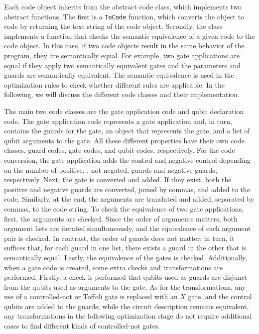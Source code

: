Each code object inherits from the abstract code class, which implements two abstract functions. The first is a \texttt{ToCode} function, which converts the object to code by returning the text string of the code object. Secondly, the class implements a function that checks the semantic equivalence of a given code to the code object. In this case, if two code objects result in the same behavior of the program, they are semantically equal. For example, two gate applications are equal if they apply two semantically equivalent gates and the parameters and guards are semantically equivalent. The semantic equivalence is used in the optimization rules to check whether different rules are applicable. In the following, we will discuss the different code classes and their implementation. 

The main two code classes are the gate application code and qubit declaration code. The gate application code represents a gate application and, in turn, contains the guards for the gate, an object that represents the gate, and a list of qubit arguments to the gate. All these different properties have their own code classes, guard codes, gate codes, and qubit codes, respectively. For the code conversion, the gate application adds the control and negative control depending on the number of positive, \ie, not-negated, guards and negative guards, respectively. Next, the gate is converted and added. If they exist, both the positive and negative guards are converted, joined by commas, and added to the code. Similarly, at the end, the arguments are translated and added, separated by commas, to the code string. To check the equivalence of two gate applications, first, the arguments are checked. 
Since the order of arguments matters, both argument lists are iterated simultaneously, and the equivalence of each argument pair is checked. In contrast, the order of guards does not matter; in turn, it suffices that, for each guard in one list, there exists a guard in the other that is semantically equal. Lastly, the equivalence of the gates is checked. 
Additionally, when a gate code is created, some extra checks and transformations are performed. Firstly, a check is performed that qubits used as guards are disjunct from the qubits used as arguments to the gate. As for the transformations, any use of a controlled-not or Toffoli gate is replaced with an $X$ gate, and the control qubits are added to the guards; while the circuit description remains equivalent, any transformations in the following optimization stage do not require additional cases to find different kinds of controlled-not gates.

